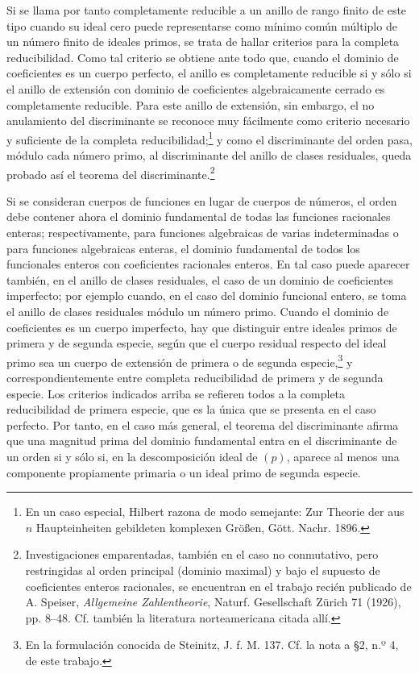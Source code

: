 \documentclass[11pt]{article}
\begin{document}
Si se llama por tanto completamente reducible a un anillo de rango finito de este tipo cuando su ideal cero puede representarse como mínimo común múltiplo de un número finito de ideales primos, se trata de hallar criterios para la completa reducibilidad. Como tal criterio se obtiene ante todo que, cuando el dominio de coeficientes es un cuerpo perfecto, el anillo es completamente reducible si y sólo si el anillo de extensión con dominio de coeficientes algebraicamente cerrado es completamente reducible. Para este anillo de extensión, sin embargo, el no anulamiento del discriminante se reconoce muy fácilmente como criterio necesario y suficiente de la completa reducibilidad;\footnote{En un caso especial, Hilbert razona de modo semejante: Zur Theorie der aus $n$ Haupteinheiten gebildeten komplexen Größen, Gött. Nachr. 1896.} y como el discriminante del orden pasa, módulo cada número primo, al discriminante del anillo de clases residuales, queda probado así el teorema del discriminante.\footnote{Investigaciones emparentadas, también en el caso no conmutativo, pero restringidas al orden principal (dominio maximal) y bajo el supuesto de coeficientes enteros racionales, se encuentran en el trabajo recién publicado de A. Speiser, \emph{Allgemeine Zahlentheorie}, Naturf. Gesellschaft Zürich 71 (1926), pp. 8--48. Cf. también la literatura norteamericana citada allí.}

Si se consideran cuerpos de funciones en lugar de cuerpos de números, el orden debe contener ahora el dominio fundamental de todas las funciones racionales enteras; respectivamente, para funciones algebraicas de varias indeterminadas o para funciones algebraicas enteras, el dominio fundamental de todos los funcionales enteros con coeficientes racionales enteros. En tal caso puede aparecer también, en el anillo de clases residuales, el caso de un dominio de coeficientes imperfecto; por ejemplo cuando, en el caso del dominio funcional entero, se toma el anillo de clases residuales módulo un número primo. Cuando el dominio de coeficientes es un cuerpo imperfecto, hay que distinguir entre ideales primos de primera y de segunda especie, según que el cuerpo residual respecto del ideal primo sea un cuerpo de extensión de primera o de segunda especie,\footnote{En la formulación conocida de Steinitz, J. f. M. 137. Cf. la nota a \S 2, n.º 4, de este trabajo.} y correspondientemente entre completa reducibilidad de primera y de segunda especie. Los criterios indicados arriba se refieren todos a la completa reducibilidad de primera especie, que es la única que se presenta en el caso perfecto. Por tanto, en el caso más general, el teorema del discriminante afirma que una magnitud prima del dominio fundamental entra en el discriminante de un orden si y sólo si, en la descomposición ideal de $(p)$, aparece al menos una componente propiamente primaria o un ideal primo de segunda especie.
\end{document}
